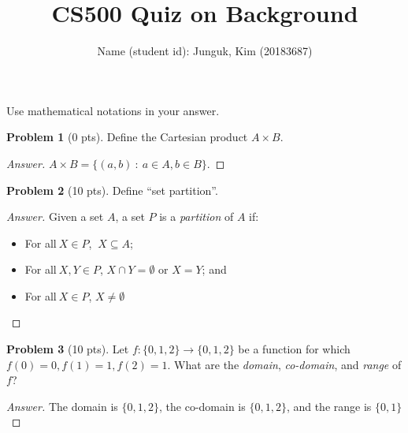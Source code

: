 \documentclass[11pt,a4paper,oneside,microtype,nokorean]{oblivoir}
\theoremstyle{definition}
\newtheorem{problem}{Problem}
\begin{document}
\title{CS500 Quiz on Background}
\author{Name (student id): Junguk, Kim (20183687) }
\maketitle

\noindent Use mathematical notations in your answer.

\begin{problem}[0 pts]
  Define the Cartesian product $A \times B$.
\end{problem}
\begin{proof}[Answer]
  $A \times B = \{(a,b)~:~a \in A, b \in B\}$.
\end{proof}


\begin{problem}[10 pts]
  Define ``set partition''.
\end{problem}
\begin{proof}[Answer]
  Given a set $A$, a set $P$ is a \emph{partition} of $A$ if:

\begin{itemize}
\item For all$~X \in P$, $~X \subseteq A$;
\item For all$~X,Y \in P$, $X \cap Y = \emptyset$ or $X = Y$; and
\item For all$~X \in P$, $X \neq \emptyset$
\end{itemize}
\end{proof}


\begin{problem}[10 pts]
  Let $f: \{0,1,2\} \to \{0,1,2\}$ be a function for which $f(0) = 0, f(1) = 1, f(2) = 1$.  What are
  the \emph{domain}, \emph{co-domain}, and \emph{range} of $f$?
\end{problem}
\begin{proof}[Answer]
The domain is $\{0,1,2\}$, the co-domain is $\{0,1,2\}$, and the range is $\{0,1\}$

\end{proof}
\end{document}
